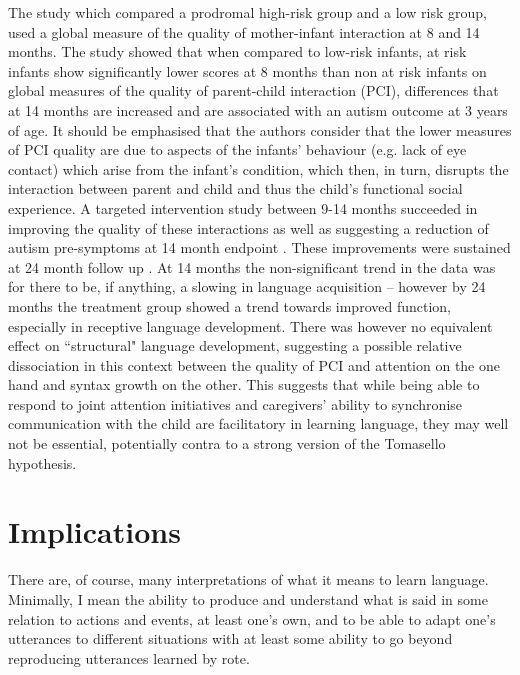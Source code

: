 \documentclass[output=paper]{langsci/langscibook}
\begin{document}
The \citet{Wan2013} study which compared a prodromal high-risk group and a low risk group, used a global measure of the quality of mother-infant interaction at 8 and 14 months. The study showed that when compared to low-risk infants, at risk infants show significantly lower scores at 8 months than non at risk infants on global measures of the quality of parent-child interaction (PCI),  differences that at 14 months are increased and are associated with an autism outcome at 3 years of age. It should be emphasised that the authors consider that the lower measures of PCI quality are due to aspects of the infants’ behaviour (e.g. lack of eye contact) which arise from the infant’s condition, which then, in turn, disrupts the interaction between parent and child and thus the child’s functional social experience.  A targeted intervention study between 9-14 months succeeded in improving the quality of these interactions as well as suggesting a reduction of autism pre-symptoms at 14 month endpoint \citep{Green2013}. These improvements were sustained at 24 month follow up \citep{Green2015Parent}. At 14 months the non-significant trend in the data was for there to be, if anything, a slowing in  language acquisition – however by 24 months the treatment group showed a trend towards improved function, especially in receptive language development.  There was however no equivalent effect on ``structural" language development, suggesting a possible relative dissociation in this context between the quality of PCI  and attention on the one hand and syntax growth on the other. This suggests that while being able to respond to joint attention initiatives and caregivers’ ability to synchronise communication with the child are facilitatory in learning language,  they may well not be essential, potentially contra to a strong version of the Tomasello hypothesis.

\largerpage
\section{Implications}

\largerpage
There are, of course, many interpretations of what it means to learn language.  Minimally, I mean the ability to produce and understand what is said in some relation to actions and events, at least one’s own, and to be able to adapt one’s utterances to different situations with at least some ability to go beyond reproducing utterances learned by rote.  
\end{document}

